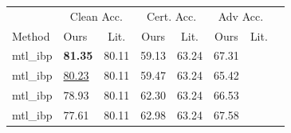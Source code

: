 \begin{tabular}{llcccccc}
\toprule
 & \multicolumn{2}{c}{Clean Acc.} & \multicolumn{2}{c}{Cert. Acc.} & \multicolumn{2}{c}{Adv Acc.} \\
Method & Ours & Lit. & Ours & Lit. & Ours & Lit. \\
\midrule
mtl\_ibp & \textbf{81.35} & 80.11 & 59.13 & 63.24 & 67.31 & \\
mtl\_ibp & \underline{80.23} & 80.11 & 59.47 & 63.24 & 65.42 & \\
mtl\_ibp & 78.93 & 80.11 & 62.30 & 63.24 & 66.53 & \\
mtl\_ibp & 77.61 & 80.11 & 62.98 & 63.24 & 67.58 & \\
\bottomrule
\end{tabular}